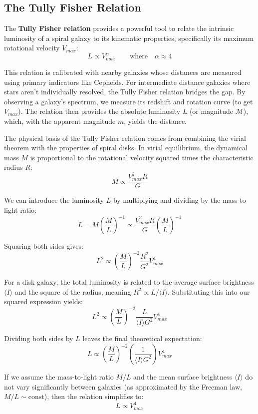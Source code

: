 \subsection{The Tully Fisher Relation}

The \textbf{Tully Fisher relation} provides a powerful tool to relate the intrinsic luminosity of a spiral galaxy to its kinematic properties, specifically its maximum rotational velocity $V_{max}$:
$$
L \propto V_{max}^\alpha \qquad \text{where} \quad \alpha \approx 4
$$

This relation is calibrated with nearby galaxies whose distances are measured using primary indicators like Cepheids. For intermediate distance galaxies where stars aren't individually resolved, the Tully Fisher relation bridges the gap. By observing a galaxy's spectrum, we measure its redshift and rotation curve (to get $V_{max}$). The relation then provides the absolute luminosity $L$ (or magnitude $\mathcal{M}$), which, with the apparent magnitude $m$, yields the distance.

The physical basis of the Tully Fisher relation comes from combining the virial theorem with the properties of spiral disks. In virial equilibrium, the dynamical mass $M$ is proportional to the rotational velocity squared times the characteristic radius $R$:
$$
M \propto \frac{V_{max}^2 R}{G}
$$

We can introduce the luminosity $L$ by multiplying and dividing by the mass to light ratio:
$$
L = M \left( \frac{M}{L} \right)^{-1} \propto \frac{V_{max}^2 R}{G} \left( \frac{M}{L} \right)^{-1}
$$

Squaring both sides gives:
$$
L^2 \propto \left( \frac{M}{L} \right)^{-2} \frac{R^2}{G^2} V_{max}^4
$$

For a disk galaxy, the total luminosity is related to the average surface brightness $\langle I \rangle$ and the square of the radius, meaning $R^2 \propto L / \langle I \rangle$. Substituting this into our squared expression yields:
$$
L^2 \propto \left( \frac{M}{L} \right)^{-2} \frac{L}{\langle I \rangle G^2} V_{max}^4
$$

Dividing both sides by $L$ leaves the final theoretical expectation:
$$
L \propto \left( \frac{M}{L} \right)^{-2} \left(\frac{1}{\langle I \rangle G^2} \right) V_{max}^4
$$

If we assume the mass-to-light ratio $M/L$ and the mean surface brightness $\langle I \rangle$ do not vary significantly between galaxies (as approximated by the Freeman law, $M/L \sim \mathrm{const}$), then the relation simplifies to:
$$
L \propto V_{max}^4
$$

